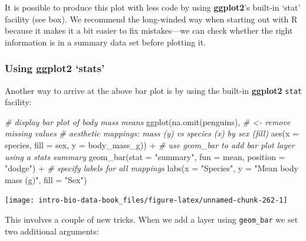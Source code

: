 \documentclass[
]{book}
\newenvironment{Shaded}{\begin{snugshade}}{\end{snugshade}}
\newcommand{\AttributeTok}[1]{\textcolor[rgb]{0.77,0.63,0.00}{#1}}
\newcommand{\CommentTok}[1]{\textcolor[rgb]{0.56,0.35,0.01}{\textit{#1}}}
\newcommand{\FunctionTok}[1]{\textcolor[rgb]{0.00,0.00,0.00}{#1}}
\newcommand{\NormalTok}[1]{#1}
\newcommand{\SpecialCharTok}[1]{\textcolor[rgb]{0.00,0.00,0.00}{#1}}
\newcommand{\StringTok}[1]{\textcolor[rgb]{0.31,0.60,0.02}{#1}}
\newenvironment{greybox}{
  \definecolor{shadecolor}{rgb}{0.95,0.95,0.95}  %
  \color{black}
  \begin{shaded}}
 {\end{shaded}}
\newenvironment{infobox}[1]
  {
  \begin{itemize}
  \renewcommand{\labelitemi}{
    \raisebox{-.7\height}[0pt][0pt]{
      {\setkeys{Gin}{width=3em,keepaspectratio}
        \texttt{[image: images/\#1]}}
    }
  }
  \setlength{\fboxsep}{1em}
  \begin{greybox}
  \item
  }
  {
  \end{greybox}
  \end{itemize}
  }
\begin{document}
It is possible to produce this plot with less code by using \textbf{ggplot2}'s built-in `stat' facility (see box). We recommend the long-winded way when starting out with R because it makes it a bit easier to fix mistakes---we can check whether the right information is in a summary data set before plotting it.

\begin{infobox}{information}

\hypertarget{using-ggplot2-stats}{%
\subsubsection*{\texorpdfstring{Using \textbf{ggplot2} `stats'}{Using ggplot2 `stats'}}\label{using-ggplot2-stats}}

Another way to arrive at the above bar plot is by using the built-in \textbf{ggplot2} \texttt{stat} facility:

\begin{Shaded}
\begin{Highlighting}[]
\CommentTok{\# display bar plot of body mass means}
\FunctionTok{ggplot}\NormalTok{(}\FunctionTok{na.omit}\NormalTok{(penguins), }\CommentTok{\# \textless{}{-} remove missing values}
       \CommentTok{\# aesthetic mappings: mass (y) vs species (x) by sex (fill)}
       \FunctionTok{aes}\NormalTok{(}\AttributeTok{x =}\NormalTok{ species, }\AttributeTok{fill =}\NormalTok{ sex, }\AttributeTok{y =}\NormalTok{ body\_mass\_g)) }\SpecialCharTok{+}
  \CommentTok{\# use geom\_bar to add bar plot layer using a stats summary}
  \FunctionTok{geom\_bar}\NormalTok{(}\AttributeTok{stat =} \StringTok{"summary"}\NormalTok{, }\AttributeTok{fun =}\NormalTok{ mean, }\AttributeTok{position =} \StringTok{"dodge"}\NormalTok{) }\SpecialCharTok{+}
  \CommentTok{\# specify labels for all mappings}
  \FunctionTok{labs}\NormalTok{(}\AttributeTok{x =} \StringTok{"Species"}\NormalTok{, }\AttributeTok{y =} \StringTok{"Mean body mass (g)"}\NormalTok{, }\AttributeTok{fill =} \StringTok{"Sex"}\NormalTok{)}
\end{Highlighting}
\end{Shaded}

\begin{center}\texttt{[image: intro-bio-data-book\_files/figure-latex/unnamed-chunk-262-1]} \end{center}

This involves a couple of new tricks. When we add a layer using \texttt{geom\_bar} we set two additional arguments:


\end{infobox}
\end{document}

